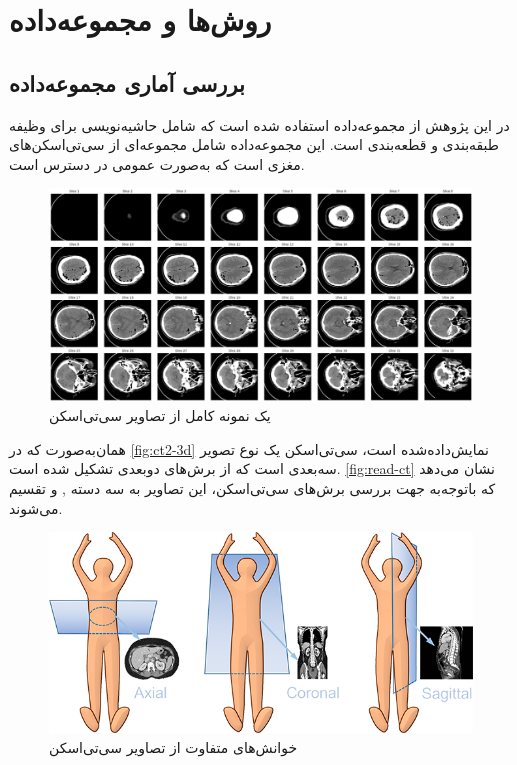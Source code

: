 \chapter{روش‌ها و مجموعه‌داده}
\section{بررسی آماری مجموعه‌داده}

در این پژوهش از مجموعه‌داده
\cite{physionet_hssayeni2020intracranial,hssayeni2020computed}
استفاده شده است که شامل حاشیه‌نویسی برای وظیفه طبقه‌بندی و قطعه‌بندی است. این مجموعه‌داده  شامل مجموعه‌ای از سی‌تی‌اسکن‌های مغزی است که به‌صورت عمومی در دسترس است.
\begin{figure}[h]
\centering
\includegraphics[width=1.0\linewidth]{Images/Chapter2/3d}
\caption{یک نمونه کامل از تصاویر سی‌تی‌اسکن}
\label{fig:ct2-3d}
\end{figure}


همان‌به‌صورت که در 
\autoref{fig:ct2-3d}
نمایش‌داده‌شده است، سی‌تی‌اسکن یک نوع تصویر سه‌بعدی است که از برش‌های دوبعدی تشکیل شده است. 
\autoref{fig:read-ct}
 نشان می‌دهد که
 باتوجه‌‌به جهت بررسی برش‌های سی‌تی‌اسکن، این تصاویر به سه دسته 
 ,  و 
 تقسیم می‌شوند.
\begin{figure}[h]
\centering
\includegraphics[width=1.0\linewidth]{"Images/Chapter2/read CT"}
\caption{خوانش‌های متفاوت از تصاویر سی‌تی‌اسکن
\cite{kaggleCTScansDICOM}}
\label{fig:read-ct}
\end{figure}
 
